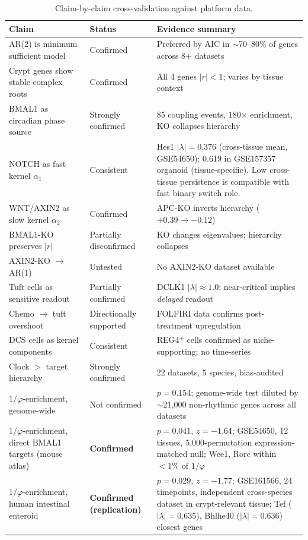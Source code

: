 \documentclass[11pt,letterpaper]{article}
\theoremstyle{definition}
\theoremstyle{remark}
\begin{document}
\begin{table}[H]
\centering
\caption{Claim-by-claim cross-validation against platform data.}
\label{tab:validation}
\small
\begin{tabular}{p{5.5cm}p{2.2cm}p{5.5cm}}
\toprule
\textbf{Claim} & \textbf{Status} & \textbf{Evidence summary} \\
\midrule
AR(2) is minimum sufficient model & Confirmed & Preferred by AIC in $\sim$70--80\% of genes across 8+ datasets \\
Crypt genes show stable complex roots & Confirmed & All 4 genes $|r| < 1$; varies by tissue context \\
BMAL1 as circadian phase source & Strongly confirmed & 85 coupling events, 180$\times$ enrichment, KO collapses hierarchy \\
NOTCH as fast kernel $\alpha_1$ & Consistent & Hes1 $|\lambda| = 0.376$ (cross-tissue mean, GSE54650); 0.619 in GSE157357 organoid (tissue-specific). Low cross-tissue persistence is compatible with fast binary switch role. \\
WNT/AXIN2 as slow kernel $\alpha_2$ & Confirmed & APC-KO inverts hierarchy ($+0.39 \to -0.12$) \\
BMAL1-KO preserves $|r|$ & Partially disconfirmed & KO changes eigenvalues; hierarchy collapses \\
AXIN2-KO $\to$ AR(1) & Untested & No AXIN2-KO dataset available \\
Tuft cells as sensitive readout & Partially confirmed & DCLK1 $|\lambda| \approx 1.0$: near-critical implies \textit{delayed} readout \\
Chemo $\to$ tuft overshoot & Directionally supported & FOLFIRI data confirms post-treatment upregulation \\
DCS cells as kernel components & Consistent & REG4$^+$ cells confirmed as niche-supporting; no time-series \\
Clock $>$ target hierarchy & Strongly confirmed & 22 datasets, 5 species, bias-audited \\
$1/\varphi$-enrichment, genome-wide & Not confirmed & $p = 0.154$; genome-wide test diluted by $\sim$21{,}000 non-rhythmic genes across all datasets \\
$1/\varphi$-enrichment, direct BMAL1 targets (mouse atlas) & \textbf{Confirmed} & $p = 0.041$, $z = -1.64$; GSE54650, 12 tissues, 5{,}000-permutation expression-matched null; Wee1, Rorc within $<1\%$ of $1/\varphi$ \\
$1/\varphi$-enrichment, human intestinal enteroid & \textbf{Confirmed (replication)} & $p = 0.029$, $z = -1.77$; GSE161566, 24 timepoints, independent cross-species dataset in crypt-relevant tissue; Tef ($|\lambda|=0.635$), Bhlhe40 ($|\lambda|=0.636$) closest genes \\

\end{tabular}
\end{table}
\end{document}
